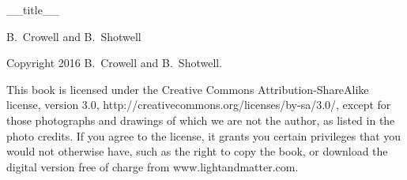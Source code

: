 \begin{titlepage}
	\centering
        {\Huge __title__}

	\vspace{1cm}

        {\Large B.~Crowell and B.~Shotwell}
\end{titlepage}


\noindent Copyright 2016 B.~Crowell and B.~Shotwell.

\vspace{2cm}

\noindent    This book is licensed under the Creative Commons
    Attribution-ShareAlike license, version 3.0,
    http://creativecommons.org/licenses/by-sa/3.0/,
    except for those photographs and
    drawings of which we are not the author, as listed in the photo credits.
    If you agree to the license, it grants you certain privileges that
    you would not otherwise have, such as the right to copy the book,
    or download the digital version free of charge from
    www.lightandmatter.com.
